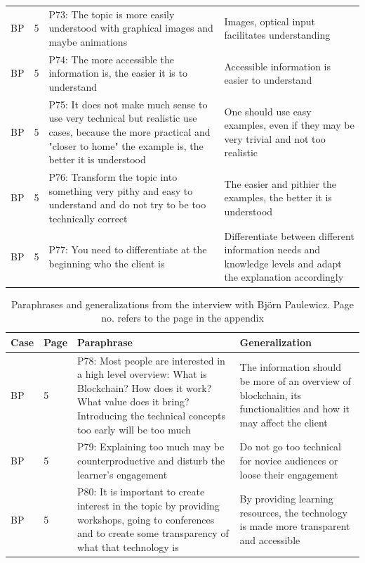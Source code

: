\begin{table}[H]
\begin{tabularx}{\textwidth}{ll|X|p{4.5cm}}
	BP & 5 & P73: The topic is more easily understood with graphical images and maybe animations & Images, optical input facilitates understanding   \\ 
	BP & 5 & P74: The more accessible the information is, the easier it is to understand & Accessible information is easier to understand   \\ 
	BP & 5 & P75: It does not make much sense to use very technical but realistic use cases, because the more practical and "closer to home" the example is, the better it is understood & One should use easy examples, even if they may be very trivial and not too realistic   \\ 
	BP & 5 & P76: Transform the topic into something very pithy and easy to understand and do not try to be too technically correct & The easier and pithier the examples, the better it is understood   \\ 
	BP & 5 & P77: You need to differentiate at the beginning who the client is & Differentiate between different information needs and knowledge levels and adapt the explanation accordingly   \\ 
	\end{tabularx}
    \label{tab:my_label}
\end{table}

\begin{table}[H]
    \centering
    \begin{tabularx}{\textwidth}{ll|X|p{4.5cm}}
    Case & Page & Paraphrase & Generalization  \\ \hline
	BP & 5 & P78: Most people are interested in a high level overview: What is Blockchain? How does it work? What value does it bring? Introducing the technical concepts too early will be too much & The information should be more of an overview of blockchain, its functionalities and how it may affect the client   \\ 
	BP & 5 & P79: Explaining too much may be counterproductive and disturb the learner's engagement & Do not go too technical for novice audiences or loose their engagement   \\ 
	BP & 5 & P80: It is important to create interest in the topic by providing workshops, going to conferences and to create some transparency of what that technology is & By providing learning resources, the technology is made more transparent and accessible   \\ 
    \end{tabularx}
    \caption{Paraphrases and generalizations from the interview with Björn Paulewicz. Page no. refers to the page in the appendix}
    \label{tab:my_label}
\end{table}


